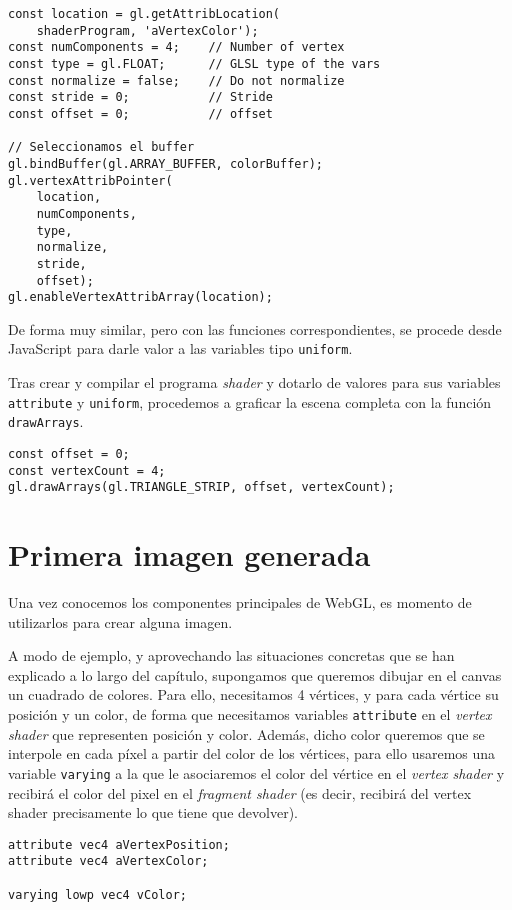 \begin{lstlisting}
const location = gl.getAttribLocation(
    shaderProgram, 'aVertexColor');
const numComponents = 4;    // Number of vertex
const type = gl.FLOAT;      // GLSL type of the vars
const normalize = false;    // Do not normalize
const stride = 0;           // Stride
const offset = 0;           // offset

// Seleccionamos el buffer
gl.bindBuffer(gl.ARRAY_BUFFER, colorBuffer);
gl.vertexAttribPointer(
    location,
    numComponents,
    type,
    normalize,
    stride,
    offset);
gl.enableVertexAttribArray(location);
\end{lstlisting}

De forma muy similar, pero con las funciones correspondientes, se procede desde JavaScript para darle valor a las variables tipo \verb|uniform|.

Tras crear y compilar el programa \textit{shader} y dotarlo de valores para sus variables \verb|attribute| y \verb|uniform|, procedemos a graficar la escena completa con la función \verb|drawArrays|.

\begin{lstlisting}
const offset = 0;
const vertexCount = 4;
gl.drawArrays(gl.TRIANGLE_STRIP, offset, vertexCount);
\end{lstlisting}

\section{Primera imagen generada}

Una vez conocemos los componentes principales de WebGL, es momento de utilizarlos para crear alguna imagen.

A modo de ejemplo, y aprovechando las situaciones concretas que se han explicado a lo largo del capítulo, supongamos que queremos dibujar en el canvas un cuadrado de colores. Para ello, necesitamos 4 vértices, y para cada vértice su posición y un color, de forma que necesitamos variables \verb|attribute| en el \textit{vertex shader} que representen posición y color. Además, dicho color queremos que se interpole en cada píxel a partir del color de los vértices, para ello usaremos una variable \verb|varying| a la que le asociaremos el color del vértice en el \textit{vertex shader} y recibirá el color del pixel en el \textit{fragment shader} (es decir, recibirá del vertex shader precisamente lo que tiene que devolver).
\begin{lstlisting}
attribute vec4 aVertexPosition;
attribute vec4 aVertexColor;

varying lowp vec4 vColor;
\end{lstlisting}

